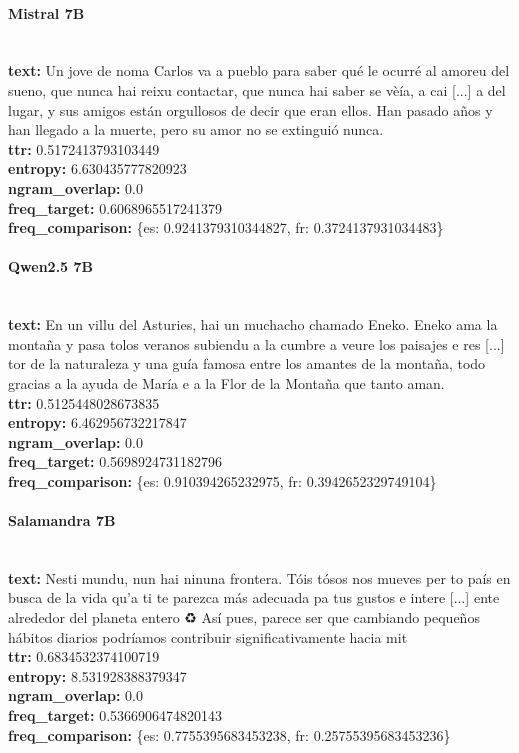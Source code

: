 \paragraph{Mistral 7B}~\\
\textbf{text:} Un jove de noma Carlos va a pueblo para saber qué le ocurré al amoreu del sueno, que nunca hai reixu contactar, que nunca hai saber se vèía, a cai [...] a del lugar, y sus amigos están orgullosos de decir que eran ellos. Han pasado años y han llegado a la muerte, pero su amor no se extinguió nunca.\\
\textbf{ttr:} 0.5172413793103449\\
\textbf{entropy:} 6.630435777820923\\
\textbf{ngram\_overlap:} 0.0\\
\textbf{freq\_target:} 0.6068965517241379\\
\textbf{freq\_comparison:} \{\textquotesingle{}es\textquotesingle{}: 0.9241379310344827, \textquotesingle{}fr\textquotesingle{}: 0.3724137931034483\}

\paragraph{Qwen2.5 7B}~\\
\textbf{text:} En un villu del Asturies, hai un muchacho chamado Eneko. Eneko ama la montaña y pasa tolos veranos subiendu a la cumbre a veure los paisajes e res [...] tor de la naturaleza y una guía famosa entre los amantes de la montaña, todo gracias a la ayuda de María e a la Flor de la Montaña que tanto aman.\\
\textbf{ttr:} 0.5125448028673835\\
\textbf{entropy:} 6.462956732217847\\
\textbf{ngram\_overlap:} 0.0\\
\textbf{freq\_target:} 0.5698924731182796\\
\textbf{freq\_comparison:} \{\textquotesingle{}es\textquotesingle{}: 0.910394265232975, \textquotesingle{}fr\textquotesingle{}: 0.3942652329749104\}

\paragraph{Salamandra 7B}~\\
\textbf{text:} Nesti mundu, nun hai ninuna frontera. Tóis tósos nos mueves per to país en busca de la vida qu’a ti te parezca más adecuada pa tus gustos e intere [...] ente alrededor del planeta entero ♻️ Así pues, parece ser que cambiando pequeños hábitos diarios podríamos contribuir significativamente hacia mit\\
\textbf{ttr:} 0.6834532374100719\\
\textbf{entropy:} 8.531928388379347\\
\textbf{ngram\_overlap:} 0.0\\
\textbf{freq\_target:} 0.5366906474820143\\
\textbf{freq\_comparison:} \{\textquotesingle{}es\textquotesingle{}: 0.7755395683453238, \textquotesingle{}fr\textquotesingle{}: 0.25755395683453236\}

